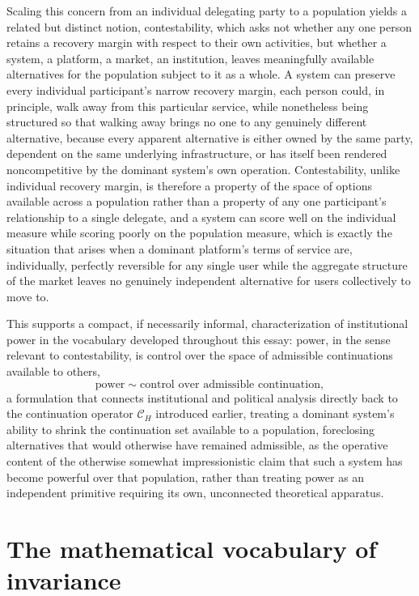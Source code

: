 \documentclass[11pt]{article}
\begin{document}
Scaling this concern from an individual delegating party to a population yields a related but distinct notion, contestability, which asks not whether any one person retains a recovery margin with respect to their own activities, but whether a system, a platform, a market, an institution, leaves meaningfully available alternatives for the population subject to it as a whole. A system can preserve every individual participant's narrow recovery margin, each person could, in principle, walk away from this particular service, while nonetheless being structured so that walking away brings no one to any genuinely different alternative, because every apparent alternative is either owned by the same party, dependent on the same underlying infrastructure, or has itself been rendered noncompetitive by the dominant system's own operation. Contestability, unlike individual recovery margin, is therefore a property of the space of options available across a population rather than a property of any one participant's relationship to a single delegate, and a system can score well on the individual measure while scoring poorly on the population measure, which is exactly the situation that arises when a dominant platform's terms of service are, individually, perfectly reversible for any single user while the aggregate structure of the market leaves no genuinely independent alternative for users collectively to move to.

This supports a compact, if necessarily informal, characterization of institutional power in the vocabulary developed throughout this essay: power, in the sense relevant to contestability, is control over the space of admissible continuations available to others,
$$\text{power} \sim \text{control over admissible continuation},$$
a formulation that connects institutional and political analysis directly back to the continuation operator $\mathcal{C}_{H}$ introduced earlier, treating a dominant system's ability to shrink the continuation set available to a population, foreclosing alternatives that would otherwise have remained admissible, as the operative content of the otherwise somewhat impressionistic claim that such a system has become powerful over that population, rather than treating power as an independent primitive requiring its own, unconnected theoretical apparatus.

\section{The mathematical vocabulary of invariance}
\end{document}
